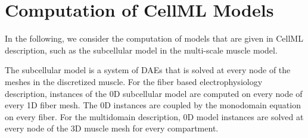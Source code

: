 % 




\section{Computation of CellML Models}\label{sec:computation_cellml_models}

In the following, we consider the computation of models that are given in CellML description, such as the subcellular model in the multi-scale muscle model.

The subcellular model is a system of DAEs that is solved at every node of the meshes in the discretized muscle.
For the fiber based electrophysiology description, instances of the 0D subcellular model are computed on every node of every 1D fiber mesh. The 0D instances are coupled by the monodomain equation on every fiber. For the multidomain description, 0D model instances are solved at every node of the 3D muscle mesh for every compartment.

